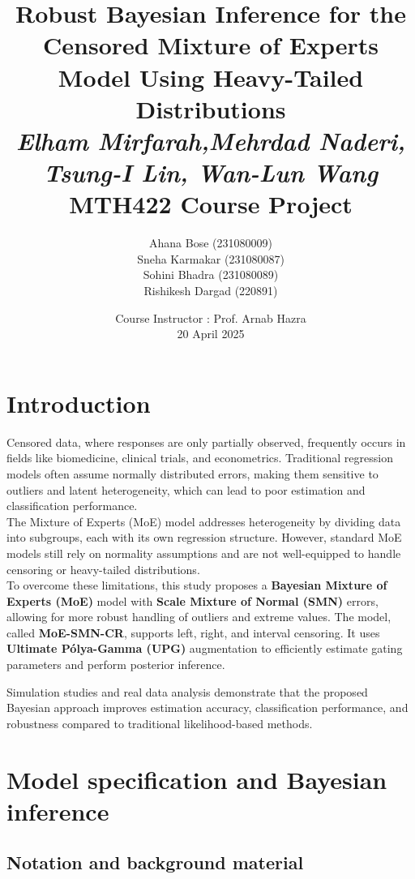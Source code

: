 \documentclass[10.5pt]{article} %
\title{
  \textbf{Robust Bayesian Inference for the Censored Mixture of Experts Model Using Heavy-Tailed Distributions}\\[0.5em]
  \textit{Elham Mirfarah,Mehrdad Naderi, Tsung-I Lin, Wan-Lun Wang} \\[0.5em]
  \large MTH422 Course Project
}
\author{
  Ahana Bose (231080009) \\
  Sneha Karmakar (231080087) \\
  Sohini Bhadra (231080089) \\
  Rishikesh Dargad (220891)
}
\date{Course Instructor : Prof. Arnab Hazra\\[0.5em]20 April 2025}
\begin{document}
\maketitle
\thispagestyle{empty}

\tableofcontents
\newpage



\section{Introduction}

Censored data, where responses are only partially observed, frequently occurs in fields like biomedicine, clinical trials, and econometrics. Traditional regression models often assume normally distributed errors, making them sensitive to outliers and latent heterogeneity, which can lead to poor estimation and classification performance.\\

\noindent
The Mixture of Experts (MoE) model addresses heterogeneity by dividing data into subgroups, each with its own regression structure. However, standard MoE models still rely on normality assumptions and are not well-equipped to handle censoring or heavy-tailed distributions.\\

\noindent
To overcome these limitations, this study proposes a \textbf{Bayesian Mixture of Experts (MoE)} model with \textbf{Scale Mixture of Normal (SMN)} errors, allowing for more robust handling of outliers and extreme values. The model, called \textbf{MoE-SMN-CR}, supports left, right, and interval censoring. It uses \textbf{Ultimate Pólya-Gamma (UPG)} augmentation to efficiently estimate gating parameters and perform posterior inference.

\noindent
Simulation studies and real data analysis demonstrate that the proposed Bayesian approach improves estimation accuracy, classification performance, and robustness compared to traditional likelihood-based methods.

\section{Model specification and Bayesian inference}

\subsection{Notation and background material}
\end{document}
